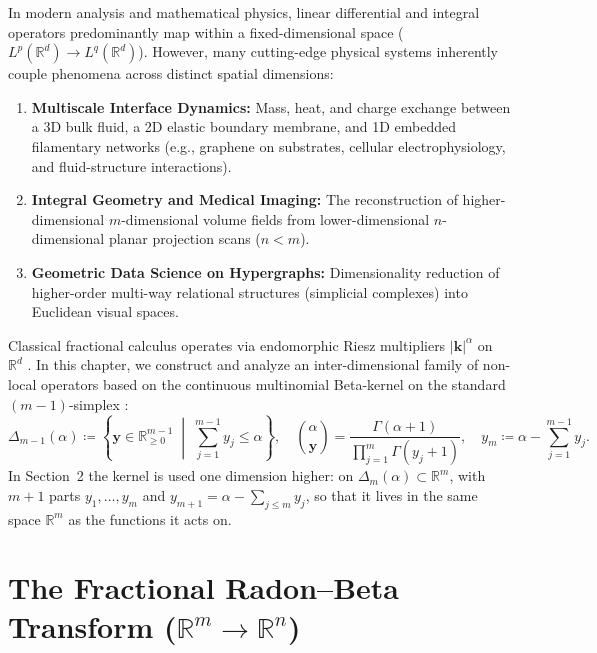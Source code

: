 \documentclass[11pt,a4paper]{article}
\theoremstyle{plain}
\theoremstyle{definition}
\theoremstyle{remark}
\numberwithin{equation}{section}
\begin{document}
In modern analysis and mathematical physics, linear differential and integral operators predominantly map within a fixed-dimensional space ($L^p(\mathbb{R}^d) \to L^q(\mathbb{R}^d)$). However, many cutting-edge physical systems inherently couple phenomena across distinct spatial dimensions:
\begin{enumerate}
    \item \textbf{Multiscale Interface Dynamics:} Mass, heat, and charge exchange between a 3D bulk fluid, a 2D elastic boundary membrane, and 1D embedded filamentary networks (e.g., graphene on substrates, cellular electrophysiology, and fluid-structure interactions).
    \item \textbf{Integral Geometry and Medical Imaging:} The reconstruction of higher-dimensional $m$-dimensional volume fields from lower-dimensional $n$-dimensional planar projection scans ($n < m$).
    \item \textbf{Geometric Data Science on Hypergraphs:} Dimensionality reduction of higher-order multi-way relational structures (simplicial complexes) into Euclidean visual spaces.
\end{enumerate}

Classical fractional calculus operates via endomorphic Riesz multipliers $|\mathbf{k}|^\alpha$ on $\mathbb{R}^d$ \cite{samko1993}. In this chapter, we construct and analyze an inter-dimensional family of non-local operators based on the continuous multinomial Beta-kernel on the standard $(m-1)$-simplex \cite{silvafilho2026simplex, silvafilho2026waves}:
\begin{equation}
\Delta_{m-1}(\alpha) \coloneqq \left\{\mathbf{y} \in \mathbb{R}_{\ge 0}^{m-1} \;\middle|\; \sum_{j=1}^{m-1} y_j \le \alpha\right\}, \quad \binom{\alpha}{\mathbf{y}} = \frac{\Gamma(\alpha+1)}{\prod_{j=1}^m \Gamma(y_j+1)}, \quad y_m \coloneqq \alpha - \sum_{j=1}^{m-1} y_j .
\end{equation}
In Section~2 the kernel is used one dimension higher: on $\Delta_m(\alpha) \subset \mathbb{R}^m$, with $m+1$ parts $y_1, \dots, y_m$ and $y_{m+1} = \alpha - \sum_{j \le m} y_j$, so that it lives in the same space $\mathbb{R}^m$ as the functions it acts on.

\section{The Fractional Radon--Beta Transform \texorpdfstring{($\mathbb{R}^m \to \mathbb{R}^n$)}{(Rm -> Rn)}}
\end{document}
